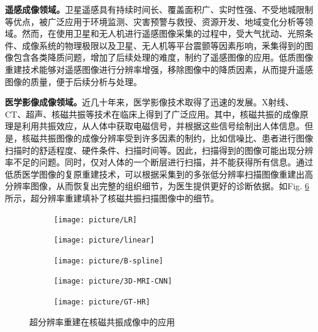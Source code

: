 \documentclass[letterpaper,10pt]{article}
\begin{document}
	\textbf{遥感成像领域。}卫星遥感具有持续时间长、覆盖面积广、实时性强、不受地城限制等优点，被广泛应用于环境监测、灾害预警与救授、资源开发、地域变化分析等领域。然而，在使用卫星和无人机进行遥感图像采集的过程中，受大气扰动、光照条件、成像系统的物理极限以及卫星、无人机等平台震颤等因素彤响，釆集得到的图像包含各类降质问题，增加了后续处理的难度，制约了遥感图像的应用。低质图像重建技术能够对遥感图像进行分辨率增强，移除图像中的降质因素，从而提升遥感图像的质量，便于后续分析与处理。
	
	\textbf{医学影像成像领域。}近几十年来，医学影像技术取得了迅速的发展。X射线、CT、超声、核磁共振等技术在临床上得到了广泛应用。其中，核磁共振的成像原理是利用共振效应，从人体中获取电磁信号，并根据这些信号绘制出人体信息。但是，核磁共振图像的成像分辨率受到许多因素的制约，比如信噪比、患者进行图像扫描时的舒适程度、硬件条件、扫描时间等。因此，扫描得到的图像可能出现分辨率不足的问题。同时，仅对人体的一个断层进行扫描，并不能获得所有信息。通过低质医学图像的复原重建技术，可以根据采集到的多张低分辨率扫描图像重建出高分辨率图像，从而恢复出完整的组织细节，为医生提供更好的诊断依据。如Fig. \ref{fig: Super resolution reconstruction}所示，超分辨率重建填补了核磁共振扫描图像中的细节。
	
	    \begin{figure}[htbp] 
		\centering 
		
		\begin{subfigure}{0.15\textwidth}
			\texttt{[image: picture/LR]}
			\captionsetup{font=scriptsize}
			\label{fig:LR input}
		\end{subfigure}
		\begin{subfigure}{0.15\textwidth}
			\texttt{[image: picture/linear]}
			\captionsetup{font=scriptsize}
			\label{fig: Linear}
		\end{subfigure}
		\begin{subfigure}{0.15\textwidth}
			\texttt{[image: picture/B-spline]}
			\captionsetup{font=scriptsize}
			\label{fig: B-spline}	
		\end{subfigure}
		\begin{subfigure}{0.15\textwidth}
			\texttt{[image: picture/3D-MRI-CNN]}
			\captionsetup{font=scriptsize}
			\label{fig: 3D MRI CNN}
		\end{subfigure}
		\begin{subfigure}{0.15\textwidth}
			\texttt{[image: picture/GT-HR]}
			\captionsetup{font=scriptsize}
			\label{fig: GT HR}
		\end{subfigure}
		\captionsetup{font=scriptsize}
		\caption{
			\label{fig: Super resolution reconstruction}
			超分辨率重建在核磁共振成像中的应用 \cite{McDonagh_2017}
		}
	    \end{figure}
	
\end{document}

